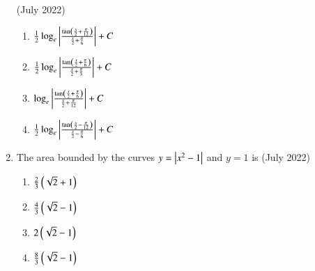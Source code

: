 \documentclass[journal,12pt,onecolumn]{IEEEtran}
\theoremstyle{remark}
\begin{document}
\begin{enumerate}
   \hfill{(July 2022)} 
	\begin{enumerate}
        \item $\frac{1}{2}\log_e\left\vert\frac{\tan\left(\frac{x}{2}+\frac{\pi}{12}\right)}{\frac{x}{2}+\frac{\pi}{6}}\right\vert + C $
        \item $\frac{1}{2}\log_e\left\vert\frac{\tan\left(\frac{x}{2}+\frac{\pi}{6}\right)}{\frac{x}{2}+\frac{\pi}{3}}\right\vert + C $
        \item $\log_e\left\vert\frac{\tan\left(\frac{x}{2}+\frac{\pi}{6}\right)}{\frac{x}{2}+\frac{\pi}{12}}\right\vert + C $
        \item $\frac{1}{2}\log_e\left\vert\frac{\tan\left(\frac{x}{2}-\frac{\pi}{12}\right)}{\frac{x}{2}-\frac{\pi}{6}}\right\vert + C $
    \end{enumerate}
    \item The area bounded by the curves $y=\left\vert x^2-1\right\vert$ and $y=1$ is 
   \hfill{(July 2022)} 
\begin{enumerate}
        \item $\frac{2}{3}\left(\sqrt{2}+1\right)$
        \item $\frac{4}{3}\left(\sqrt{2}-1\right)$
        \item $2\left(\sqrt{2}-1\right)$
        \item $\frac{8}{3}\left(\sqrt{2}-1\right)$
    \end{enumerate}
    \end{enumerate}
\end{document}
